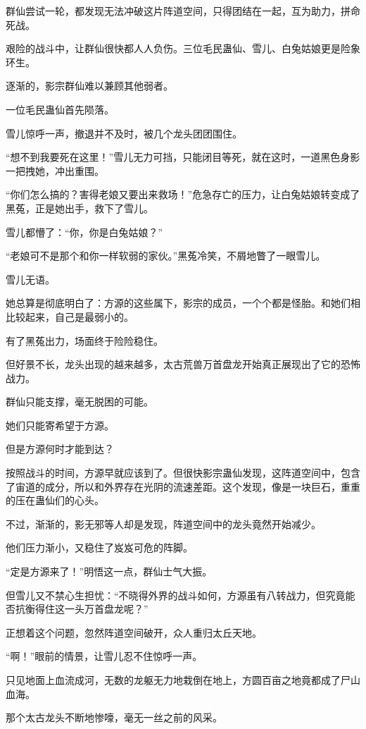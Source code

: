 \begin{this_body}
群仙尝试一轮，都发现无法冲破这片阵道空间，只得团结在一起，互为助力，拼命死战。

艰险的战斗中，让群仙很快都人人负伤。三位毛民蛊仙、雪儿、白兔姑娘更是险象环生。

逐渐的，影宗群仙难以兼顾其他弱者。

一位毛民蛊仙首先陨落。

雪儿惊呼一声，撤退并不及时，被几个龙头团团围住。

“想不到我要死在这里！”雪儿无力可挡，只能闭目等死，就在这时，一道黑色身影一把拽她，冲出重围。

“你们怎么搞的？害得老娘又要出来救场！”危急存亡的压力，让白兔姑娘转变成了黑菟，正是她出手，救下了雪儿。

雪儿都懵了：“你，你是白兔姑娘？”

“老娘可不是那个和你一样软弱的家伙。”黑菟冷笑，不屑地瞥了一眼雪儿。

雪儿无语。

她总算是彻底明白了：方源的这些属下，影宗的成员，一个个都是怪胎。和她们相比较起来，自己是最弱小的。

有了黑菟出力，场面终于险险稳住。

但好景不长，龙头出现的越来越多，太古荒兽万首盘龙开始真正展现出了它的恐怖战力。

群仙只能支撑，毫无脱困的可能。

她们只能寄希望于方源。

但是方源何时才能到达？

按照战斗的时间，方源早就应该到了。但很快影宗蛊仙发现，这阵道空间中，包含了宙道的成分，所以和外界存在光阴的流速差距。这个发现，像是一块巨石，重重的压在蛊仙们的心头。

不过，渐渐的，影无邪等人却是发现，阵道空间中的龙头竟然开始减少。

他们压力渐小，又稳住了岌岌可危的阵脚。

“定是方源来了！”明悟这一点，群仙士气大振。

但雪儿又不禁心生担忧：“不晓得外界的战斗如何，方源虽有八转战力，但究竟能否抗衡得住这一头万首盘龙呢？”

正想着这个问题，忽然阵道空间破开，众人重归太丘天地。

“啊！”眼前的情景，让雪儿忍不住惊呼一声。

只见地面上血流成河，无数的龙躯无力地栽倒在地上，方圆百亩之地竟都成了尸山血海。

那个太古龙头不断地惨嚎，毫无一丝之前的风采。


\end{this_body}

